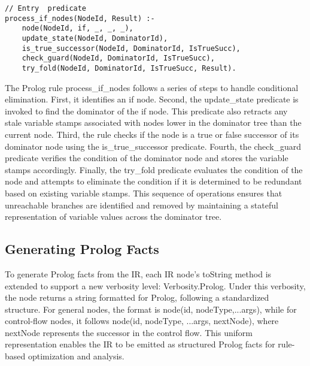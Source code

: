 \begin{lstlisting}
// Entry  predicate
process_if_nodes(NodeId, Result) :-
    node(NodeId, if, _, _, _),
    update_state(NodeId, DominatorId),
    is_true_successor(NodeId, DominatorId, IsTrueSucc),
    check_guard(NodeId, DominatorId, IsTrueSucc),
    try_fold(NodeId, DominatorId, IsTrueSucc, Result).
\end{lstlisting}

The Prolog rule process_if_nodes follows a series of steps to handle conditional elimination. First, it identifies an if node. Second, the update_state predicate is invoked to find the dominator of the if node. This predicate also retracts any stale variable stamps associated with nodes lower in the dominator tree than the current node. Third, the rule checks if the node is a true or false successor of its dominator node using the is_true_successor predicate. Fourth, the check_guard predicate verifies the condition of the dominator node and stores the variable stamps accordingly. Finally, the try_fold predicate evaluates the condition of the node and attempts to eliminate the condition if it is determined to be redundant based on existing variable stamps. This sequence of operations ensures that unreachable branches are identified and removed by maintaining a stateful representation of variable values across the dominator tree.


\subsection{Generating Prolog Facts}
To generate Prolog facts from the IR, each IR node’s toString method is extended to support a new verbosity level: Verbosity.Prolog. Under this verbosity, the node returns a string formatted for Prolog, following a standardized structure. For general nodes, the format is node(id, nodeType,...args), while for control-flow nodes, it follows node(id, nodeType, ...args, nextNode), where nextNode represents the successor in the control flow. This uniform representation enables the IR to be emitted as structured Prolog facts for rule-based optimization and analysis.

